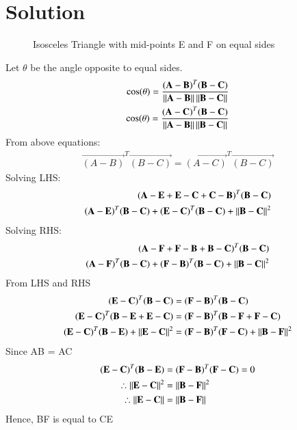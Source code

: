 \documentclass[journal,12pt,twocolumn]{IEEEtran}
\begin{document}
 \section{Solution}
\renewcommand{\thefigure}{1}
\renewcommand{\thefigure}{1}
\begin{figure}[!h]
\centering
\resizebox{\columnwidth}{!}{}
\caption{Isosceles Triangle with mid-points E and F on equal sides}
\label{myfig}
\end{figure}
Let $\theta$ be the angle opposite to equal sides.
\begin{align}
\cos(\theta) = \frac{\mathbf{(A-B)}^T\mathbf{(B-C)}}{\left\lVert\mathbf{A-B}\right\rVert\left\lVert\mathbf{B-C}\right\rVert}\\
\cos(\theta) = \frac{\mathbf{(A-C)}^T\mathbf{(B-C)}}{\left\lVert\mathbf{A-B}\right\rVert\left\lVert\mathbf{B-C}\right\rVert}
\end{align}
From above equations:
\begin{align}
\vec{(A-B)}^T\vec{(B-C)}=\vec{(A-C)}^T\vec{(B-C)}
\end{align}
Solving LHS:
\begin{align}
\mathbf{(A-E+E-C+C-B)}^T\mathbf{(B-C)}\\
\mathbf{(A-E)}^T\mathbf{(B-C)+(E-C)}^T\mathbf{(B-C)+\left\lVert B-C\right\rVert}^2
\end{align}
Solving RHS:
\begin{align}
\mathbf{(A-F+F-B+B-C)}^T\mathbf{(B-C)}\\
\mathbf{(A-F)}^T\mathbf{(B-C)+(F-B)}^T\mathbf{(B-C)+\left\lVert B-C\right\rVert}^2
\end{align}
From LHS and RHS
\begin{align}
\mathbf{(E-C)}^T\mathbf{(B-C)} &= \mathbf{(F-B)}^T\mathbf{(B-C)}\\
\mathbf{(E-C)}^T\mathbf{(B-E+E-C)} &= \mathbf{(F-B)}^T\mathbf{(B-F+F-C)}\\
\mathbf{(E-C)}^T\mathbf{(B-E)+\left\lVert E-C\right\rVert}^2 &= \mathbf{(F-B)}^T\mathbf{(F-C)+\left\lVert B-F\right\rVert}^2
\end{align}
Since AB = AC
\begin{align}
\mathbf{(E-C)}^T\mathbf{(B-E)} &= \mathbf{(F-B)}^T\mathbf{(F-C)} = 0\\
\therefore \left\lVert\mathbf{E-C}\right\rVert^2 &= \left\lVert\mathbf{B-F}\right\rVert^2\\
\therefore \left\lVert\mathbf{E-C}\right\rVert &= \left\lVert\mathbf{B-F}\right\rVert
\end{align}
Hence, BF is equal to CE
 
\end{document}
